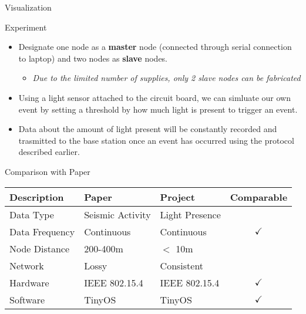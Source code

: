 \begin{frame}[t,fragile]{Visualization}
\begin{center}
\end{center}
\end{frame}

\begin{frame}[t,fragile]{Experiment}
\begin{itemize}
\item<1-> Designate one node as a \textbf{master} node (connected through serial connection to laptop) and two nodes as \textbf{slave} nodes. 
\begin{itemize}
\item<1-> \textit{Due to the limited number of supplies, only 2 slave nodes can be fabricated}
\end{itemize}
\item<2-> Using a light sensor attached to the circuit board, we can simluate our own event by setting a threshold by how much light is present to trigger an event.
\item<3-> Data about the amount of light present will be constantly recorded and trasmitted to the base station once an event has occurred using the protocol described earlier.
\end{itemize}
\end{frame}

\begin{frame}[t,fragile]{Comparison with Paper}
\begin{center}
\begin{tabular}{| l | l | l | c |}
\hline
Description & Paper & Project & Comparable \\
\hline
Data Type & Seismic Activity & Light Presence & \color{red}{X} \\
Data Frequency & Continuous & Continuous & $\checkmark$ \\
Node Distance & 200-400m & $<$ 10m & \color{red}{X} \\
Network & Lossy & Consistent & \color{red}{X} \\
Hardware & IEEE 802.15.4 & IEEE 802.15.4 & $\checkmark$ \\
Software & TinyOS & TinyOS & $\checkmark$ \\
\hline
\end{tabular}
\end{center}
\end{frame}

